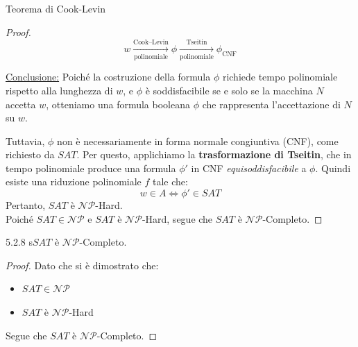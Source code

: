 \documentclass{article}  %
\theoremstyle{definition}
\begin{document}
\begin{theorem}{Teorema di Cook-Levin}
\begin{proof}
		\[
			w \xrightarrow[\text{polinomiale}]{\text{Cook–Levin}} \phi
			\xrightarrow[\text{polinomiale}]{\text{Tseitin}} \phi_{\text{CNF}}
		\]

		\underline{Conclusione:} Poiché la costruzione della formula $\phi$ richiede tempo polinomiale rispetto alla lunghezza di $w$,
		e $\phi$ è soddisfacibile se e solo se la macchina $N$ accetta $w$,
		otteniamo una formula booleana $\phi$ che rappresenta l’accettazione di $N$ su $w$.

		Tuttavia, $\phi$ non è necessariamente in forma normale congiuntiva (CNF), come richiesto da $SAT$.
		Per questo, applichiamo la \textbf{trasformazione di Tseitin}, che in tempo polinomiale produce una formula $\phi'$ in CNF \textit{equisoddisfacibile} a $\phi$.
		Quindi esiste una riduzione polinomiale $f$ tale che:
		\[
			w \in A \iff \phi' \in SAT
		\]
		Pertanto, $SAT$ è $\mathcal{NP}$-Hard. \\
		Poiché $SAT \in \mathcal{NP}$ e $SAT$ è $\mathcal{NP}$-Hard, segue che $SAT$ è $\mathcal{NP}$-Completo.
	\end{proof}
\end{theorem}

\begin{theorem}{5.2.8}
	s$SAT$ è $\mathcal{NP}$-Completo.
	\footnotesize
	\begin{proof}
		Dato che si è dimostrato che:
		\begin{itemize}
			\item $SAT \in \mathcal{NP}$
			\item $SAT$ è $\mathcal{NP}$-Hard
		\end{itemize}
		Segue che $SAT$ è $\mathcal{NP}$-Completo.
	\end{proof}
\end{theorem}
\end{document}
